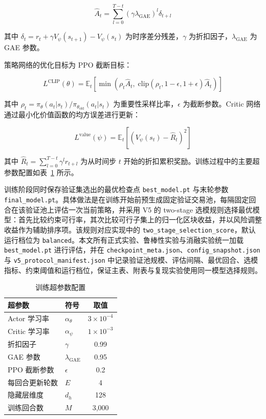 \begin{equation}
  \hat{A}_t = \sum_{l=0}^{T-t} (\gamma \lambda_{\text{GAE}})^l \delta_{t+l}
\end{equation}

其中 $\delta_t = r_t + \gamma V_\psi(s_{t+1}) - V_\psi(s_t)$ 为时序差分残差，$\gamma$ 为折扣因子，$\lambda_{\text{GAE}}$ 为 GAE 参数。

策略网络的优化目标为 PPO 截断目标：

\begin{equation}
  L^{\text{CLIP}}(\theta) = \mathbb{E}_t \left[ \min\left( \rho_t \hat{A}_t, \; \text{clip}(\rho_t, 1-\epsilon, 1+\epsilon) \hat{A}_t \right) \right]
\end{equation}

其中 $\rho_t = \pi_\theta(a_t|s_t) / \pi_{\theta_{\text{old}}}(a_t|s_t)$ 为重要性采样比率，$\epsilon$ 为截断参数。Critic 网络通过最小化价值函数的均方误差进行更新：

\begin{equation}
  L^{\text{value}}(\psi) = \mathbb{E}_t \left[ (V_\psi(s_t) - \hat{R}_t)^2 \right]
\end{equation}

其中 $\hat{R}_t = \sum_{l=0}^{T-t} \gamma^l r_{t+l}$ 为从时间步 $t$ 开始的折扣累积奖励。训练过程中的主要超参数配置如表~\ref{tab:hyperparams} 所示。

训练阶段同时保存验证集选出的最优检查点 \texttt{best\_model.pt} 与末轮参数 \texttt{final\_model.pt}。具体做法是在训练开始前预生成固定验证交易池，每隔固定回合在该验证池上评估一次当前策略，并采用 V5 的 two-stage 选模规则选择最优模型：首先比较约束可行率，其次比较可行子集上的归一化区块收益，并以风险调整收益作为辅助排序项。该规则对应实现中的 \texttt{two\_stage\_selection\_score}，默认运行档位为 \texttt{balanced}。本文所有正式实验、鲁棒性实验与消融实验统一加载 \texttt{best\_model.pt} 进行评估，并在 \texttt{checkpoint\_meta.json}、\texttt{config\_snapshot.json} 与 \texttt{v5\_protocol\_manifest.json} 中记录验证池规模、评估间隔、最优回合、选模指标、约束阈值和运行档位，保证主表、附表与复现实验使用同一模型选择规则。

\begin{table}[htbp]
\centering
\caption{训练超参数配置}
\label{tab:hyperparams}
\begin{tabular}{llc}
\toprule
超参数 & 符号 & 取值 \\
\midrule
Actor 学习率 & $\alpha_\theta$ & $3 \times 10^{-4}$ \\
Critic 学习率 & $\alpha_\psi$ & $1 \times 10^{-3}$ \\
折扣因子 & $\gamma$ & 0.99 \\
GAE 参数 & $\lambda_{\text{GAE}}$ & 0.95 \\
PPO 截断参数 & $\epsilon$ & 0.2 \\
每回合更新轮数 & $E$ & 4 \\
隐藏层维度 & $d_h$ & 128 \\
训练回合数 & $M$ & 3{,}000 \\
\bottomrule
\end{tabular}
\end{table}

